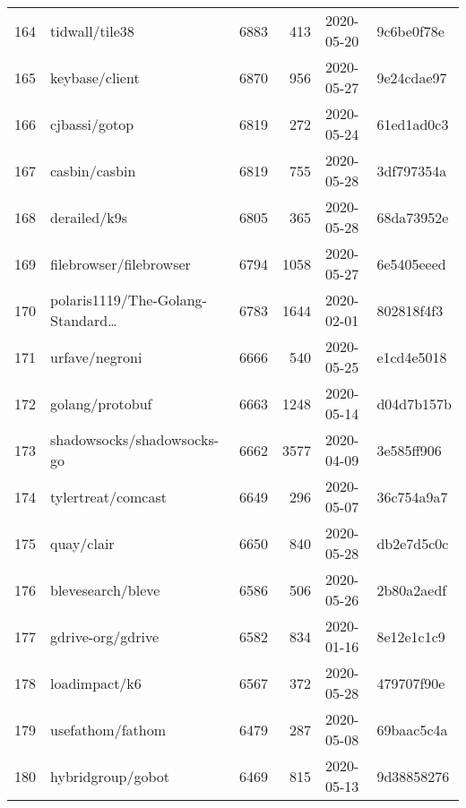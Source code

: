 \begin{footnotesize}
\begin{longtable}{llrrll}
        164 &                                     tidwall/tile38 &   6883 &    413 & 2020-05-20 &  9c6be0f78e \\
        165 &                                     keybase/client &   6870 &    956 & 2020-05-27 &  9e24cdae97 \\
        166 &                                      cjbassi/gotop &   6819 &    272 & 2020-05-24 &  61ed1ad0c3 \\
        167 &                                      casbin/casbin &   6819 &    755 & 2020-05-28 &  3df797354a \\
        168 &                                       derailed/k9s &   6805 &    365 & 2020-05-28 &  68da73952e \\
        169 &                            filebrowser/filebrowser &   6794 &   1058 & 2020-05-27 &  6e5405eeed \\
        170 &              polaris1119/The-Golang-Standard\ldots &   6783 &   1644 & 2020-02-01 &  802818f4f3 \\
        171 &                                     urfave/negroni &   6666 &    540 & 2020-05-25 &  e1cd4e5018 \\
        172 &                                    golang/protobuf &   6663 &   1248 & 2020-05-14 &  d04d7b157b \\
        173 &                         shadowsocks/shadowsocks-go &   6662 &   3577 & 2020-04-09 &  3e585ff906 \\
        174 &                                 tylertreat/comcast &   6649 &    296 & 2020-05-07 &  36c754a9a7 \\
        175 &                                         quay/clair &   6650 &    840 & 2020-05-28 &  db2e7d5c0c \\
        176 &                                  blevesearch/bleve &   6586 &    506 & 2020-05-26 &  2b80a2aedf \\
        177 &                                  gdrive-org/gdrive &   6582 &    834 & 2020-01-16 &  8e12e1c1c9 \\
        178 &                                      loadimpact/k6 &   6567 &    372 & 2020-05-28 &  479707f90e \\
        179 &                                   usefathom/fathom &   6479 &    287 & 2020-05-08 &  69baac5c4a \\
        180 &                                  hybridgroup/gobot &   6469 &    815 & 2020-05-13 &  9d38858276 \\

\end{longtable}
\end{footnotesize}
